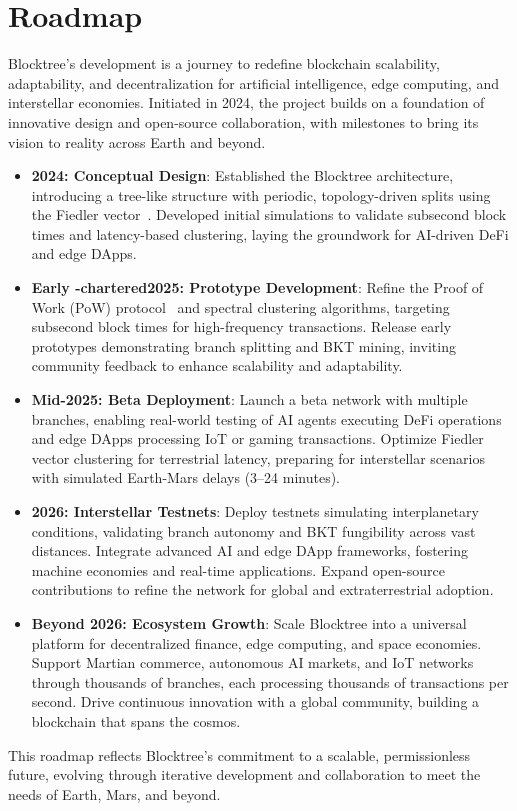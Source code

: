 \section{Roadmap}
Blocktree’s development is a journey to redefine blockchain scalability, adaptability, and decentralization for artificial intelligence, edge computing, and interstellar economies. Initiated in 2024, the project builds on a foundation of innovative design and open-source collaboration, with milestones to bring its vision to reality across Earth and beyond.

\begin{itemize}
    \item \textbf{2024: Conceptual Design}: Established the Blocktree architecture, introducing a tree-like structure with periodic, topology-driven splits using the Fiedler vector~\cite{ng2001spectral}. Developed initial simulations to validate subsecond block times and latency-based clustering, laying the groundwork for AI-driven DeFi and edge DApps.

    \item \textbf{Early -chartered2025: Prototype Development}: Refine the Proof of Work (PoW) protocol~\cite{nakamoto2008bitcoin} and spectral clustering algorithms, targeting subsecond block times for high-frequency transactions. Release early prototypes demonstrating branch splitting and BKT mining, inviting community feedback to enhance scalability and adaptability.

    \item \textbf{Mid-2025: Beta Deployment}: Launch a beta network with multiple branches, enabling real-world testing of AI agents executing DeFi operations and edge DApps processing IoT or gaming transactions. Optimize Fiedler vector clustering for terrestrial latency, preparing for interstellar scenarios with simulated Earth-Mars delays (3–24 minutes).

    \item \textbf{2026: Interstellar Testnets}: Deploy testnets simulating interplanetary conditions, validating branch autonomy and BKT fungibility across vast distances. Integrate advanced AI and edge DApp frameworks, fostering machine economies and real-time applications. Expand open-source contributions to refine the network for global and extraterrestrial adoption.

    \item \textbf{Beyond 2026: Ecosystem Growth}: Scale Blocktree into a universal platform for decentralized finance, edge computing, and space economies. Support Martian commerce, autonomous AI markets, and IoT networks through thousands of branches, each processing thousands of transactions per second. Drive continuous innovation with a global community, building a blockchain that spans the cosmos.
\end{itemize}

This roadmap reflects Blocktree’s commitment to a scalable, permissionless future, evolving through iterative development and collaboration to meet the needs of Earth, Mars, and beyond.